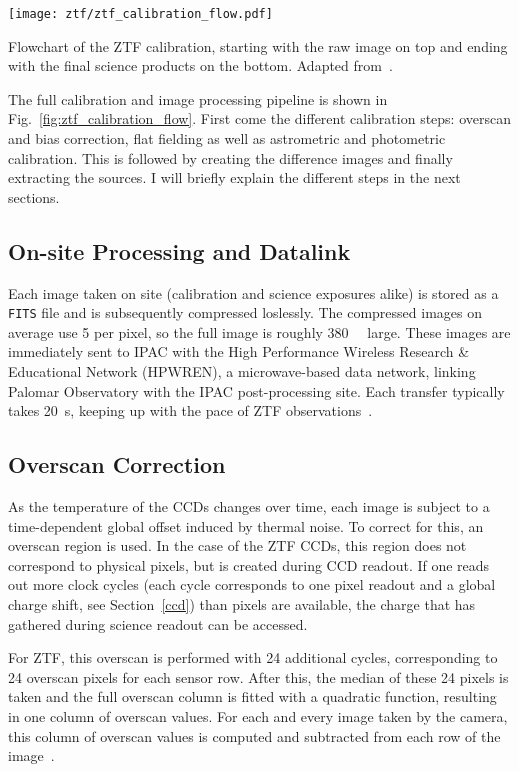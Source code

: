 \begin{marginfigure}
    \texttt{[image: ztf/ztf\_calibration\_flow.pdf]}
    \caption[ZTF realtime flowchart]{Flowchart of the ZTF calibration, starting with the raw image on top and ending with the final science products on the bottom. Adapted from~\cite{Laher2018}.}
\end{marginfigure}

The full calibration and image processing pipeline is shown in Fig.~\ref{fig:ztf_calibration_flow}. First come the different calibration steps: overscan and bias correction, flat fielding as well as astrometric and photometric calibration. This is followed by creating the difference images and finally extracting the sources. I will briefly explain the different steps in the next sections.

\subsection{On-site Processing and Datalink}\label{ztf_data_link}

Each image taken on site (calibration and science exposures alike) is stored as a \texttt{FITS} file and is subsequently compressed loslessly. The compressed images on average use \SI{5}{\bit} per pixel, so the full image is roughly \SI{380}{\mega\byte} large. These images are immediately sent to IPAC with the High Performance Wireless Research \& Educational Network (HPWREN), a microwave-based data network, linking Palomar Observatory with the IPAC post-processing site. Each transfer typically takes \SI{20}{\second}, keeping up with the pace of ZTF observations~\cite{Dekany2020}.

\subsection{Overscan Correction}
As the temperature of the CCDs changes over time, each image is subject to a time-dependent global offset induced by thermal noise. To correct for this, an overscan region is used. In the case of the ZTF CCDs, this region does not correspond to physical pixels, but is created during CCD readout. If one reads out more clock cycles (each cycle corresponds to one pixel readout and a global charge shift, see Section~\ref{ccd}) than pixels are available, the charge that has gathered during science readout can be accessed.

For ZTF, this overscan is performed with 24 additional cycles, corresponding to 24 overscan pixels for each sensor row. After this, the median of these 24 pixels is taken and the full overscan column is fitted with a quadratic function, resulting in one column of overscan values. For each and every image taken by the camera, this column of overscan values is computed and subtracted from each row of the image~\cite{Masci2019a}.

